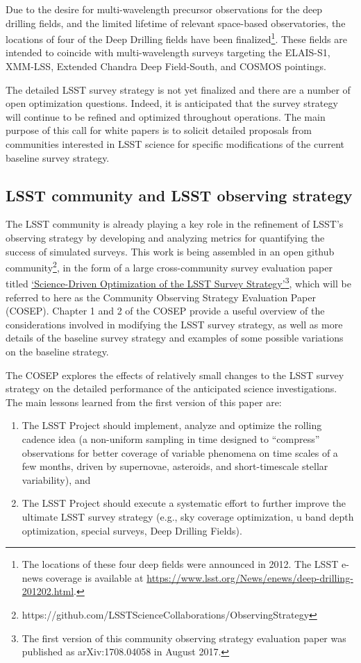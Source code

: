 \documentclass[DM,lsstdraft,toc,usenatbib]{lsstdoc}
\begin{document}
Due to the desire for multi-wavelength precursor observations for the deep drilling fields, and the limited lifetime of relevant 
space-based observatories, the locations of four of the Deep Drilling fields have been finalized\footnote{The locations
of these four deep fields were announced in 2012. The LSST e-news coverage is available at 
\href{https://www.lsst.org/News/enews/deep-drilling-201202.html}{https://www.lsst.org/News/enews/deep-drilling-201202.html}.}. 
These fields are intended to coincide with multi-wavelength surveys targeting the ELAIS-S1, XMM-LSS, Extended Chandra Deep Field-South, 
and COSMOS pointings. 

The detailed LSST survey strategy is not yet finalized and there
are a number of open optimization questions. Indeed, it is anticipated that the survey strategy 
will continue to be refined and optimized throughout operations. The main purpose of this 
call for white papers is to solicit detailed proposals from communities interested in LSST science
for specific modifications of the current baseline survey strategy. 


\subsection{LSST community and LSST observing strategy}

The LSST community is already playing a key role in the refinement of LSST's observing strategy 
by developing and analyzing metrics for quantifying the success of simulated surveys.
This work is being assembled in an open github community\footnote{
https://github.com/LSSTScienceCollaborations/ObservingStrategy}, 
in the form of a large cross-community survey evaluation paper
titled \href{http://ls.st/9fw}{`Science-Driven Optimization of the LSST Survey Strategy'}\footnote{The first 
version of this community observing strategy evaluation paper was published as arXiv:1708.04058 in August 2017.},
which will be referred to here as the Community Observing Strategy Evaluation Paper (COSEP). 
Chapter 1 and 2 of the COSEP provide a useful overview of the considerations involved in 
modifying the LSST survey strategy, as well as more details of the baseline survey strategy and 
examples of some possible variations on the baseline strategy. 

The COSEP explores the effects of relatively small changes to the LSST survey strategy
on the detailed performance of the anticipated science investigations. The main lessons 
learned from the first version of this paper are: 
\begin{enumerate} 
\item The LSST Project should implement, analyze and optimize the rolling cadence idea
(a non-uniform sampling in time designed to ``compress'' observations for better coverage
of variable phenomena on time scales of a few months, driven by supernovae, asteroids, and
short-timescale stellar variability), and 
\item The LSST Project should execute a systematic effort to further improve the ultimate
LSST survey strategy (e.g., sky coverage optimization, u band depth optimization, special 
surveys, Deep Drilling Fields). 
\end{enumerate} 
\end{document}
